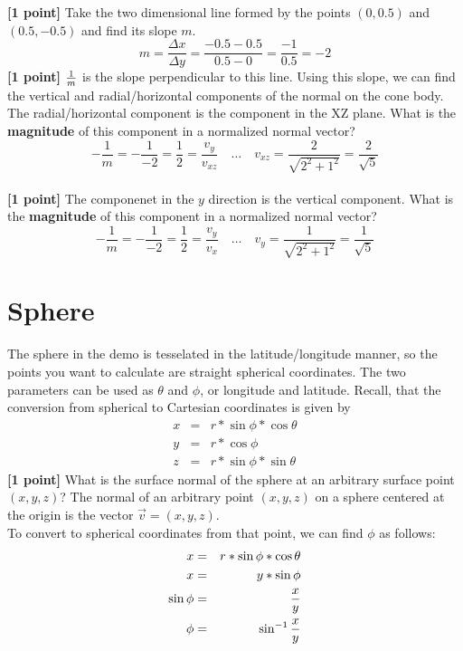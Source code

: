 \documentclass[10pt,twocolumn]{article}
\begin{document}
\vspace{2em}
{\bf [1 point]} Take the two dimensional line formed by the points $(0, 0.5)$ and $(0.5, -0.5)$ and find its slope $m$.
\vspace{2em}
\begin{equation*}
m = \frac{\Delta x}{\Delta y} = \frac{-0.5 - 0.5}{0.5 - 0} = \frac{-1}{0.5} = -2
\end{equation*}
\vspace{2em}
{\bf [1 point]} ${{1}\over{m}}$ is the slope perpendicular to this line. Using this slope, we
can find the vertical and radial/horizontal components of the normal on the cone body. The radial/horizontal component is the component in the XZ plane. What is the {\bf magnitude} of this component in a normalized normal vector?
\vspace{2em}
\begin{equation*}
-\frac{1}{m} = -\frac{1}{-2} = \frac{1}{2} = \frac{v_y}{v_{xz}}\quad \ldots \quad
v_{xz} = \frac{2}{\sqrt{2^2 + 1^2}} = \frac{2}{\sqrt{5}}
\end{equation*}
\vspace{2em}\\
{\bf [1 point]} The componenet in the $y$ direction is the vertical component. What is the {\bf magnitude} of this component in a normalized normal vector?
\vspace{2em}
\begin{equation*}
-\frac{1}{m} = -\frac{1}{-2} = \frac{1}{2} = \frac{v_y}{v_x}\quad \ldots \quad
v_y = \frac{1}{\sqrt{2^2 + 1^2}} = \frac{1}{\sqrt{5}}
\end{equation*}

\section{Sphere}
The sphere in the demo is tesselated in the latitude/longitude manner, so the points you want to calculate are straight spherical coordinates. The two parameters can be used as $\theta$ and $\phi$, or longitude and latitude. Recall, that the conversion from spherical to Cartesian coordinates is given by
\begin{eqnarray*}
x & = & r * \sin{\phi} * \cos{\theta}\\
y & = & r * \cos{\phi}\\
z & = & r * \sin{\phi}*\sin{\theta}
\end{eqnarray*}
{\bf [1 point]} What is the surface normal of the sphere at an arbitrary surface point $(x,y,z)$?
\vspace{2em}
The normal of an arbitrary point $(x,y,z)$ on a sphere centered at the origin is the vector $\vec{v} = (x,y,z)$. \\
To convert to spherical coordinates from that point, we can find $\phi$ as follows: \\
\begin{eqnarray*}
x & = & r * \sin{\phi} * \cos{\theta}\\
x & = & y * \sin{\phi}\\
\sin{\phi} & = & {{x}\over{y}} \\
\phi & = & \sin^{-1}{{x}\over{y}} \\
\end{eqnarray*}
\end{document}
